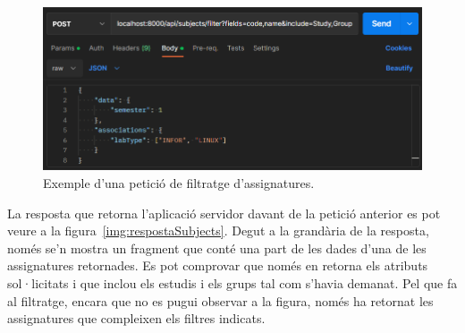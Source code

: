 \documentclass[a4paper,12pt]{ThesisStyle}
\begin{document}
\begin{figure}[H]
  \centering
  \includegraphics[width=\textwidth]{assets/proves/peticioSubjects.png}
  \caption{\label{img:peticioSubjects} Exemple d'una petició de filtratge d'assignatures.}
\end{figure}

La resposta que retorna l'aplicació servidor davant de la petició anterior es pot veure a la figura~\ref{img:respostaSubjects}. Degut a la grandària de la resposta, només se'n mostra un fragment que conté una part de les dades d'una de les assignatures retornades. Es pot comprovar que només en retorna els atributs sol·licitats i que inclou els estudis i els grups tal com s'havia demanat. Pel que fa al filtratge, encara que no es pugui observar a la figura, només ha retornat les assignatures que compleixen els filtres indicats.

\newpage
\end{document}
